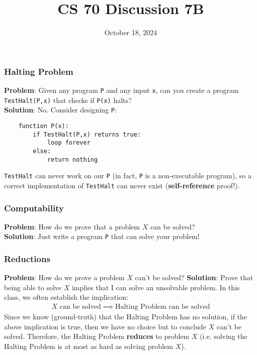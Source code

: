 \documentclass{beamer}
\title{CS 70 Discussion 7B}
\date{October 18, 2024}
\begin{document}
\frame{\titlepage}

\begin{frame}[fragile]
    \frametitle{Halting Problem}
    {\bf Problem}: Given any program \texttt{P} and any input \texttt{x}, can you create a program \texttt{TestHalt(P,x)} that checks if \texttt{P(x)} halts?\\
    {\bf Solution}: No. Consider designing \texttt{P}:
    \begin{verbatim}
    function P(x):
        if TestHalt(P,x) returns true:
            loop forever
        else:
            return nothing
    \end{verbatim}
    \texttt{TestHalt} can never work on our \texttt{P} (in fact, \texttt{P} is a non-executable program), so a correct implementation of \texttt{TestHalt} can never exist ({\bf self-reference} proof!).
\end{frame}

\begin{frame}
    \frametitle{Computability}
    {\bf Problem}: How do we prove that a problem $X$ can be solved?\\
    {\bf Solution}: Just write a program \texttt{P} that can solve your problem!
\end{frame}

\begin{frame}
    \frametitle{Reductions}
    {\bf Problem}: How do we prove a problem $X$ can't be solved?
    {\bf Solution}: Prove that being able to solve $X$ implies that I can solve an unsolvable problem. In this class, we often establish the implication:
    \begin{gather*}
        \text{$X$ can be solved}\implies\text{Halting Problem can be solved}
    \end{gather*}
    Since we know (ground-truth) that the Halting Problem has no solution, if the above implication is true, then we have no choice but to conclude $X$ can't be solved. Therefore, the Halting Problem {\bf reduces} to problem $X$ (i.e. solving the Halting Problem is at most as hard as solving problem $X$).
\end{frame}
\end{document}
